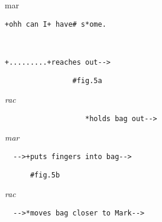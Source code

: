\documentclass[output=paper,nonflat,modfont,draft]{langsci/langscibook}
\begin{document}

\begin{mdframedkendrick}[style=firstfoc]
\begin{transbox}{1}{mar}
\begin{verbatim}
+ohh can I+ have# s*ome.
\end{verbatim}
\end{transbox}
\end{mdframedkendrick}\vspace{-5mm}

\begin{transbox}{2}{~}
\begin{verbatim}
+.........+reaches out-->
\end{verbatim}
\end{transbox}

\begin{transbox}{3}{\fig}
\begin{verbatim}
                #fig.5a
\end{verbatim}
\end{transbox}

\begin{mdframedkendrick}[style=secondfoc]
\begin{transbox}{4}{\textit{rac}}
\begin{verbatim}
                   *holds bag out-->
\end{verbatim}
\end{transbox}
\end{mdframedkendrick}\vspace{-5mm}


\begin{transbox}{6}{\textit{mar}}
\begin{verbatim}
  -->+puts fingers into bag-->
\end{verbatim}
\end{transbox}

\begin{transbox}{7}{\fig}
\begin{verbatim}
      #fig.5b
\end{verbatim}
\end{transbox}


\begin{transbox}{9}{\textit{rac}}
\begin{verbatim}
  -->*moves bag closer to Mark-->
\end{verbatim}
\end{transbox}
\end{document}
